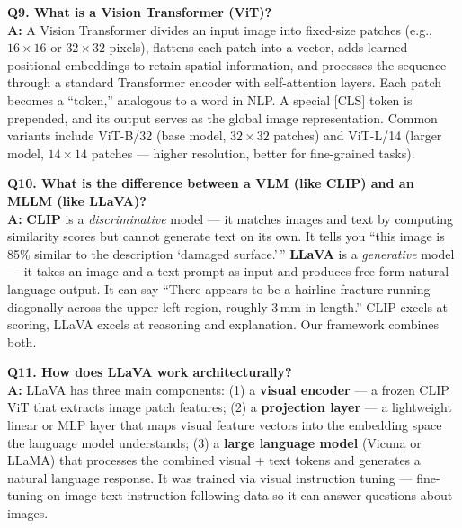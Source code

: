 \documentclass[12pt, a4paper]{article}
\begin{document}
\begin{qa}
\textbf{Q9. What is a Vision Transformer (ViT)?}\\[4pt]
\textbf{A:} A Vision Transformer divides an input image into fixed-size patches (e.g., $16{\times}16$ or $32{\times}32$ pixels), flattens each patch into a vector, adds learned positional embeddings to retain spatial information, and processes the sequence through a standard Transformer encoder with self-attention layers. Each patch becomes a ``token,'' analogous to a word in NLP. A special [CLS] token is prepended, and its output serves as the global image representation. Common variants include ViT-B/32 (base model, $32{\times}32$ patches) and ViT-L/14 (larger model, $14{\times}14$ patches --- higher resolution, better for fine-grained tasks).
\end{qa}

\begin{qa}
\textbf{Q10. What is the difference between a VLM (like CLIP) and an MLLM (like LLaVA)?}\\[4pt]
\textbf{A:} \textbf{CLIP} is a \textit{discriminative} model --- it matches images and text by computing similarity scores but cannot generate text on its own. It tells you ``this image is 85\% similar to the description `damaged surface.'\,'' \textbf{LLaVA} is a \textit{generative} model --- it takes an image and a text prompt as input and produces free-form natural language output. It can say ``There appears to be a hairline fracture running diagonally across the upper-left region, roughly 3\,mm in length.'' CLIP excels at scoring, LLaVA excels at reasoning and explanation. Our framework combines both.
\end{qa}

\begin{qa}
\textbf{Q11. How does LLaVA work architecturally?}\\[4pt]
\textbf{A:} LLaVA has three main components: (1) a \textbf{visual encoder} --- a frozen CLIP ViT that extracts image patch features; (2) a \textbf{projection layer} --- a lightweight linear or MLP layer that maps visual feature vectors into the embedding space the language model understands; (3) a \textbf{large language model} (Vicuna or LLaMA) that processes the combined visual + text tokens and generates a natural language response. It was trained via visual instruction tuning --- fine-tuning on image-text instruction-following data so it can answer questions about images.
\end{qa}
\end{document}
